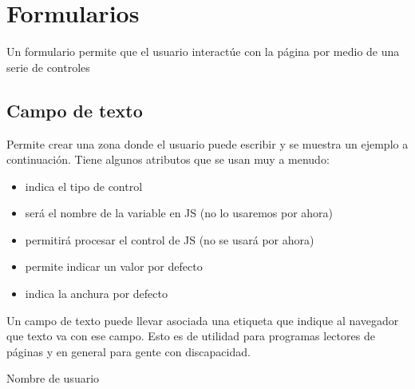 \documentclass[letterpaper,10pt,spanish]{sphinxmanual}
\begin{document}
\section{Formularios}
\label{\detokenize{tema2:formularios}}
Un formulario permite que el usuario interactúe con la página por medio de una serie de controles


\subsection{Campo de texto}
\label{\detokenize{tema2:campo-de-texto}}
Permite crear una zona donde el usuario puede escribir y se muestra un ejemplo a continuación. Tiene algunos atributos que se usan muy a menudo:
\begin{itemize}
\item {} 
 indica el tipo de control

\item {} 
 será el nombre de la variable en JS (no lo usaremos por ahora)

\item {} 
 permitirá procesar el control de JS (no se usará por ahora)

\item {} 
 permite indicar un valor por defecto

\item {} 
 indica la anchura por defecto

\end{itemize}

\begin{sphinxVerbatim}[commandchars=\\\{\}]
  
         
\end{sphinxVerbatim}

Un campo de texto puede llevar asociada una etiqueta  que indique al navegador que texto va con ese campo. Esto es de utilidad para programas lectores de páginas y en general para gente con discapacidad.

\begin{sphinxVerbatim}[commandchars=\\\{\}]
 Nombre de usuario
  
         
\end{sphinxVerbatim}
\end{document}
